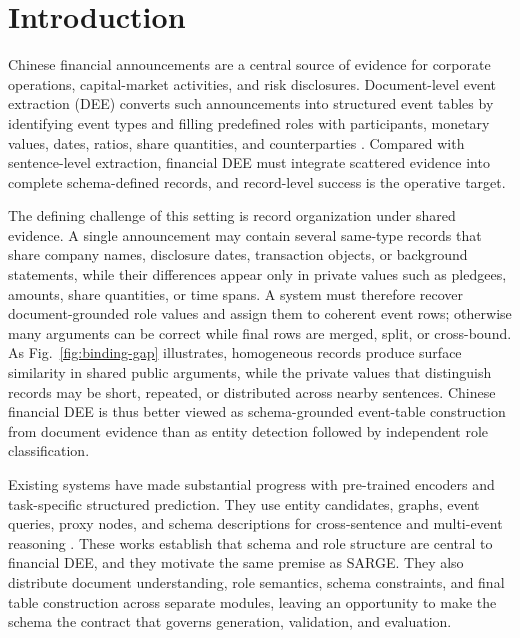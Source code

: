 \documentclass[runningheads]{llncs}
\newcommand{\method}{SARGE}
\begin{document}
\section{Introduction}
\label{sec:introduction}

Chinese financial announcements are a central source of evidence for corporate operations, capital-market activities, and risk disclosures. Document-level event extraction (DEE) converts such announcements into structured event tables by identifying event types and filling predefined roles with participants, monetary values, dates, ratios, share quantities, and counterparties \cite{chen2025docfee,han2022dueefin,zheng2019doc2edag}. Compared with sentence-level extraction, financial DEE must integrate scattered evidence into complete schema-defined records, and record-level success is the operative target.

The defining challenge of this setting is record organization under shared evidence. A single announcement may contain several same-type records that share company names, disclosure dates, transaction objects, or background statements, while their differences appear only in private values such as pledgees, amounts, share quantities, or time spans. A system must therefore recover document-grounded role values and assign them to coherent event rows; otherwise many arguments can be correct while final rows are merged, split, or cross-bound. As Fig.~\ref{fig:binding-gap} illustrates, homogeneous records produce surface similarity in shared public arguments, while the private values that distinguish records may be short, repeated, or distributed across nearby sentences. Chinese financial DEE is thus better viewed as schema-grounded event-table construction from document evidence than as entity detection followed by independent role classification.

Existing systems have made substantial progress with pre-trained encoders and task-specific structured prediction. They use entity candidates, graphs, event queries, proxy nodes, and schema descriptions for cross-sentence and multi-event reasoning \cite{hu2025epal,liang2022raat,wang2023procnet,xu2021git,xu2024seele,yang2021deppn,zheng2019doc2edag,zhu2022ptpcg}. These works establish that schema and role structure are central to financial DEE, and they motivate the same premise as \method. They also distribute document understanding, role semantics, schema constraints, and final table construction across separate modules, leaving an opportunity to make the schema the contract that governs generation, validation, and evaluation.
\end{document}
